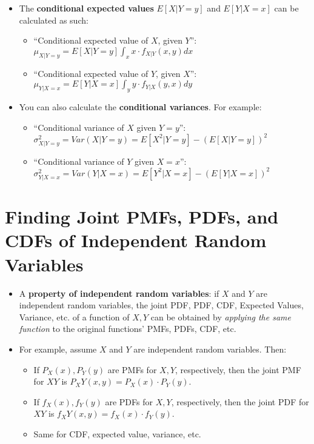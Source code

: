 \documentclass[12pt]{article}
\begin{document}
\begin{itemize}
	\item The \textbf{conditional expected values} $E[X|Y = y]$ and $E[Y |X = x]$ can be calculated as such:
	      \begin{itemize}
		      \item ``Conditional expected value of $X$, given $Y$'': $\mu_{X|Y=y} = E[X | Y=y] \int_{x} x\cdot f_{X|Y}(x, y)dx$
		      \item ``Conditional expected value of $Y$, given $X$'': $\mu_{Y|X=x} = E[Y | X=x] \int_{y} y\cdot f_{Y|X}(y, x)dy$
	      \end{itemize}
	\item You can also calculate the \textbf{conditional variances}. For example:
	      \begin{itemize}
		      \item ``Conditional variance of $X$ given $Y=y$'': $\sigma_{X|Y=y}^2 = Var(X|Y=y) = E[X^2 | Y=y] - (E[X|Y=y])^2$
		      \item ``Conditional variance of $Y$ given $X=x$'': $\sigma_{Y|X=x}^2 = Var(Y|X=x) = E[Y^2 | X=x] - (E[Y|X=x])^2$
	      \end{itemize}
\end{itemize}


\section{Finding Joint PMFs, PDFs, and CDFs of Independent Random Variables}

\begin{itemize}
	\item  A \textbf{property of independent random variables}: if $X$ and $Y$ are independent
	      random variables, the joint PDF, PDF, CDF, Expected Values, Variance, etc. of a function
	      of $X, Y$ can be obtained by \emph{applying the same function} to the original functions'
	      PMFs, PDFs, CDF, etc.
	\item For example, assume $X$ and $Y$ are independent random variables. Then:
	      \begin{itemize}
		      \item If $P_X(x), P_Y(y)$ are PMFs for $X, Y$, respectively, then
		            the joint PMF for $XY$ is $P_XY(x, y) = P_X(x) \cdot P_Y(y)$.
		      \item If $f_X(x), f_Y(y)$ are PDFs for $X, Y$, respectively, then
		            the joint PDF for $XY$ is $f_XY(x, y) = f_X(x) \cdot f_Y(y)$.
		      \item Same for CDF, expected value, variance, etc.
	      \end{itemize}
\end{itemize}
\end{document}
